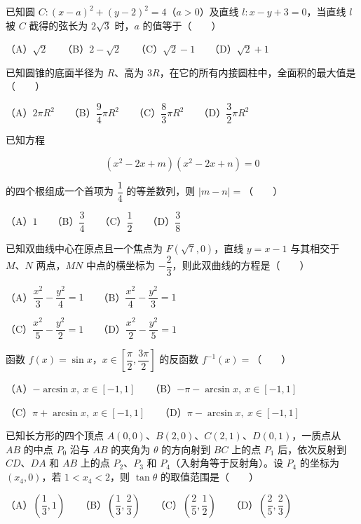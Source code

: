 \begin{question}
已知圆 $C:(x-a)^2+(y-2)^2=4$（$a>0$）及直线 $l:x-y+3=0$，当直线 $l$ 被 $C$ 截得的弦长为 $2\sqrt3$ 时，$a$ 的值等于\mbox{（　　）}

（A）$\sqrt2$　　（B）$2-\sqrt2$　　（C）$\sqrt2-1$　　（D）$\sqrt2+1$

\end{question}
\begin{question}
已知圆锥的底面半径为 $R$、高为 $3R$，在它的所有内接圆柱中，全面积的最大值是\mbox{（　　）}

（A）$2\pi R^2$　　（B）$\dfrac94\pi R^2$　　（C）$\dfrac83\pi R^2$　　（D）$\dfrac32\pi R^2$

\end{question}
\begin{question}
已知方程

\nopagebreak[4]
\[
(x^2-2x+m)(x^2-2x+n)=0
\]

的四个根组成一个首项为 $\dfrac14$ 的等差数列，则 $|m-n|=$\mbox{（　　）}

（A）$1$　　（B）$\dfrac34$　　（C）$\dfrac12$　　（D）$\dfrac38$

\end{question}
\begin{question}
已知双曲线中心在原点且一个焦点为 $F(\sqrt7,0)$，直线 $y=x-1$ 与其相交于 $M\text{、}N$ 两点，$MN$ 中点的横坐标为 $-\dfrac23$，则此双曲线的方程是\mbox{（　　）}

（A）$\dfrac{x^2}{3}-\dfrac{y^2}{4}=1$　　（B）$\dfrac{x^2}{4}-\dfrac{y^2}{3}=1$

（C）$\dfrac{x^2}{5}-\dfrac{y^2}{2}=1$　　（D）$\dfrac{x^2}{2}-\dfrac{y^2}{5}=1$

\end{question}
\begin{question}
函数 $f(x)=\sin x$，$x\in\left[\dfrac\pi2,\dfrac{3\pi}2\right]$ 的反函数 $f^{-1}(x)=$\mbox{（　　）}

（A）$-\arcsin x,\ x\in[-1,1]$　　（B）$-\pi-\arcsin x,\ x\in[-1,1]$

（C）$\pi+\arcsin x,\ x\in[-1,1]$　　（D）$\pi-\arcsin x,\ x\in[-1,1]$

\end{question}
\begin{question}
已知长方形的四个顶点 $A(0,0)\text{、}B(2,0)\text{、}C(2,1)\text{、}D(0,1)$，一质点从 $AB$ 的中点 $P_0$ 沿与 $AB$ 的夹角为 $\theta$ 的方向射到 $BC$ 上的点 $P_1$ 后，依次反射到 $CD\text{、}DA$ 和 $AB$ 上的点 $P_2\text{、}P_3$ 和 $P_4$（入射角等于反射角）。设 $P_4$ 的坐标为 $(x_4,0)$，若 $1<x_4<2$，则 $\tan\theta$ 的取值范围是\mbox{（　　）}

（A）$\left(\dfrac13,1\right)$　　（B）$\left(\dfrac13,\dfrac23\right)$　　（C）$\left(\dfrac25,\dfrac12\right)$　　（D）$\left(\dfrac25,\dfrac23\right)$

\end{question}
